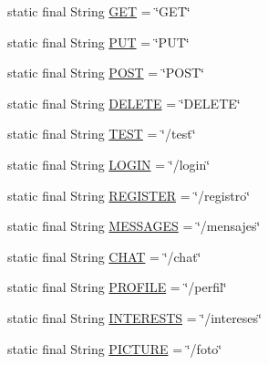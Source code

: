 \begin{DoxyCompactItemize}
\item 
static final String \hyperlink{classcom_1_1example_1_1sebastian_1_1tindertp_1_1commonTools_1_1Common_a8937fc1ac037355631286d3b45bb959b}{G\+ET} = \char`\"{}G\+ET\char`\"{}
\item 
static final String \hyperlink{classcom_1_1example_1_1sebastian_1_1tindertp_1_1commonTools_1_1Common_a034675c5513960eb228c8788a450612e}{P\+UT} = \char`\"{}P\+UT\char`\"{}
\item 
static final String \hyperlink{classcom_1_1example_1_1sebastian_1_1tindertp_1_1commonTools_1_1Common_aef1815c3b4427639e9ffdd99d36674be}{P\+O\+ST} = \char`\"{}P\+O\+ST\char`\"{}
\item 
static final String \hyperlink{classcom_1_1example_1_1sebastian_1_1tindertp_1_1commonTools_1_1Common_a67f9c93c36818b5e774ffbac7e9004ec}{D\+E\+L\+E\+TE} = \char`\"{}D\+E\+L\+E\+TE\char`\"{}
\item 
static final String \hyperlink{classcom_1_1example_1_1sebastian_1_1tindertp_1_1commonTools_1_1Common_a2cf3afaf3a741d3286bafb5606c9aede}{T\+E\+ST} = \char`\"{}/test\char`\"{}
\item 
static final String \hyperlink{classcom_1_1example_1_1sebastian_1_1tindertp_1_1commonTools_1_1Common_ac3459941ff680be2f021432f775220b3}{L\+O\+G\+IN} = \char`\"{}/login\char`\"{}
\item 
static final String \hyperlink{classcom_1_1example_1_1sebastian_1_1tindertp_1_1commonTools_1_1Common_afb144b85f2295930ca07d403cc547f48}{R\+E\+G\+I\+S\+T\+ER} = \char`\"{}/registro\char`\"{}
\item 
static final String \hyperlink{classcom_1_1example_1_1sebastian_1_1tindertp_1_1commonTools_1_1Common_acada4b49a0d72e7c468fd64c3e7ed6eb}{M\+E\+S\+S\+A\+G\+ES} = \char`\"{}/mensajes\char`\"{}
\item 
static final String \hyperlink{classcom_1_1example_1_1sebastian_1_1tindertp_1_1commonTools_1_1Common_a22cdbc7c176add88325a44caaace5168}{C\+H\+AT} = \char`\"{}/chat\char`\"{}
\item 
static final String \hyperlink{classcom_1_1example_1_1sebastian_1_1tindertp_1_1commonTools_1_1Common_a35eb34a2323adbc080a8e5836bbd57dd}{P\+R\+O\+F\+I\+LE} = \char`\"{}/perfil\char`\"{}
\item 
static final String \hyperlink{classcom_1_1example_1_1sebastian_1_1tindertp_1_1commonTools_1_1Common_add1426e1c9ce182255dd37bae66b670a}{I\+N\+T\+E\+R\+E\+S\+TS} = \char`\"{}/intereses\char`\"{}
\item 
static final String \hyperlink{classcom_1_1example_1_1sebastian_1_1tindertp_1_1commonTools_1_1Common_acdb1d46dccfc9bbec73e0ca4b7ecb96a}{P\+I\+C\+T\+U\+RE} = \char`\"{}/foto\char`\"{}

\end{DoxyCompactItemize}

